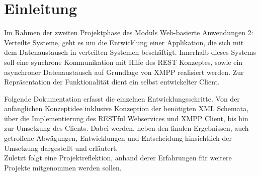 
\chapter{Einleitung}

Im Rahmen der zweiten Projektphase des Moduls Web-basierte Anwendungen 2: Verteilte Systeme, geht es um die Entwicklung einer Applikation, die sich mit dem Datenaustausch in verteilten Systemen beschäftigt. Innerhalb dieses Systems soll eine synchrone Kommunikation mit Hilfe des REST Konzeptes, sowie ein asynchroner Datenaustausch auf Grundlage von XMPP realisiert werden. Zur Repräsentation der Funktionalität dient ein selbst entwickelter Client.

\vspace{0.2cm}

Folgende Dokumentation erfasst die einzelnen Entwicklungsschritte. Von der anfänglichen Konzeptidee inklusive Konzeption der benötigten XML Schemata, über die Implementierung des RESTful Webservices und XMPP Client, bis hin zur Umsetzung des Clients. Dabei werden, neben den finalen Ergebnissen, auch getroffene Abwägungen, Entwicklungen und Entscheidung hinsichtlich der Umsetzung dargestellt und erläutert.\\
Zuletzt folgt eine Projektreflektion, anhand derer Erfahrungen für weitere Projekte mitgenommen werden sollen.
